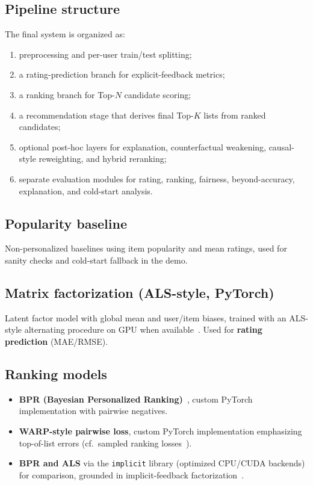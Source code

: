 \documentclass[sigconf,nonacm]{acmart}
\begin{document}
\subsection{Pipeline structure}
The final system is organized as:
\begin{enumerate}
  \item preprocessing and per-user train/test splitting;
  \item a rating-prediction branch for explicit-feedback metrics;
  \item a ranking branch for Top-$N$ candidate scoring;
  \item a recommendation stage that derives final Top-$K$ lists from ranked candidates;
  \item optional post-hoc layers for explanation, counterfactual weakening, causal-style reweighting, and hybrid reranking;
  \item separate evaluation modules for rating, ranking, fairness, beyond-accuracy, explanation, and cold-start analysis.
\end{enumerate}

\subsection{Popularity baseline}
Non-personalized baselines using item popularity and mean ratings, used for sanity checks and cold-start fallback in the demo.

\subsection{Matrix factorization (ALS-style, PyTorch)}
Latent factor model with global mean and user/item biases, trained with an ALS-style alternating procedure on GPU when available~\cite{koren2009matrix}. Used for \textbf{rating prediction} (MAE/RMSE).

\subsection{Ranking models}
\begin{itemize}
  \item \textbf{BPR (Bayesian Personalized Ranking)}~\cite{rendle2009bpr}, custom PyTorch implementation with pairwise negatives.
  \item \textbf{WARP-style pairwise loss}, custom PyTorch implementation emphasizing top-of-list errors (cf.\ sampled ranking losses~\cite{weston2011wsabie}).
  \item \textbf{BPR and ALS} via the \texttt{implicit} library (optimized CPU/CUDA backends) for comparison, grounded in implicit-feedback factorization~\cite{hu2008collaborative}.
\end{itemize}
\end{document}

